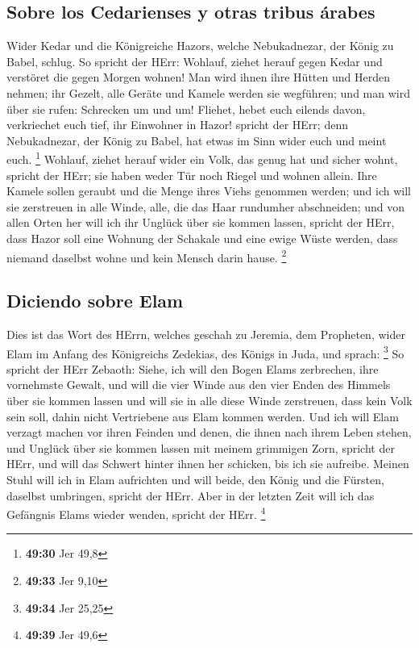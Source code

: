 \hypertarget{sobre-los-cedarienses-y-otras-tribus-uxe1rabes}{%
\subsection{Sobre los Cedarienses y otras tribus
árabes}\label{sobre-los-cedarienses-y-otras-tribus-uxe1rabes}}

 Wider Kedar und die Königreiche Hazors, welche
Nebukadnezar, der König zu Babel, schlug. So spricht der HErr: Wohlauf,
ziehet herauf gegen Kedar und verstöret die gegen Morgen wohnen!
 Man wird ihnen ihre Hütten und Herden nehmen; ihr
Gezelt, alle Geräte und Kamele werden sie wegführen; und man wird über
sie rufen: Schrecken um und um!  Fliehet, hebet euch
eilends davon, verkriechet euch tief, ihr Einwohner in Hazor! spricht
der HErr; denn Nebukadnezar, der König zu Babel, hat etwas im Sinn wider
euch und meint euch. \footnote{\textbf{49:30} Jer 49,8} 
Wohlauf, ziehet herauf wider ein Volk, das genug hat und sicher wohnt,
spricht der HErr; sie haben weder Tür noch Riegel und wohnen allein.
 Ihre Kamele sollen geraubt und die Menge ihres Viehs
genommen werden; und ich will sie zerstreuen in alle Winde, alle, die
das Haar rundumher abschneiden; und von allen Orten her will ich ihr
Unglück über sie kommen lassen, spricht der HErr,  dass
Hazor soll eine Wohnung der Schakale und eine ewige Wüste werden, dass
niemand daselbst wohne und kein Mensch darin hause. \footnote{\textbf{49:33}
  Jer 9,10}

\hypertarget{diciendo-sobre-elam}{%
\subsection{Diciendo sobre Elam}\label{diciendo-sobre-elam}}

 Dies ist das Wort des HErrn, welches geschah zu Jeremia,
dem Propheten, wider Elam im Anfang des Königreichs Zedekias, des Königs
in Juda, und sprach: \footnote{\textbf{49:34} Jer 25,25} 
So spricht der HErr Zebaoth: Siehe, ich will den Bogen Elams zerbrechen,
ihre vornehmste Gewalt,  und will die vier Winde aus den
vier Enden des Himmels über sie kommen lassen und will sie in alle diese
Winde zerstreuen, dass kein Volk sein soll, dahin nicht Vertriebene aus
Elam kommen werden.  Und ich will Elam verzagt machen vor
ihren Feinden und denen, die ihnen nach ihrem Leben stehen, und Unglück
über sie kommen lassen mit meinem grimmigen Zorn, spricht der HErr, und
will das Schwert hinter ihnen her schicken, bis ich sie aufreibe.
 Meinen Stuhl will ich in Elam aufrichten und will beide,
den König und die Fürsten, daselbst umbringen, spricht der HErr.
 Aber in der letzten Zeit will ich das Gefängnis Elams
wieder wenden, spricht der HErr. \footnote{\textbf{49:39} Jer 49,6}

